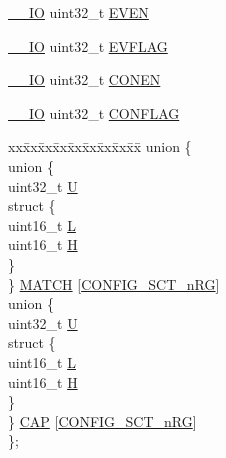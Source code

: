 \begin{DoxyCompactItemize}
\hyperlink{core__sc300_8h_aec43007d9998a0a0e01faede4133d6be}{\+\_\+\+\_\+\+IO} uint32\+\_\+t \hyperlink{struct_l_p_c___s_c_t___t_ad9f39c9fadfad8b684ab6248e25d4d37}{E\+V\+EN}
\item 
\hyperlink{core__sc300_8h_aec43007d9998a0a0e01faede4133d6be}{\+\_\+\+\_\+\+IO} uint32\+\_\+t \hyperlink{struct_l_p_c___s_c_t___t_a35160d3021178faa041dd38574ea9399}{E\+V\+F\+L\+AG}
\item 
\hyperlink{core__sc300_8h_aec43007d9998a0a0e01faede4133d6be}{\+\_\+\+\_\+\+IO} uint32\+\_\+t \hyperlink{struct_l_p_c___s_c_t___t_a594680b4be50db4bd8888f8e5791339c}{C\+O\+N\+EN}
\item 
\hyperlink{core__sc300_8h_aec43007d9998a0a0e01faede4133d6be}{\+\_\+\+\_\+\+IO} uint32\+\_\+t \hyperlink{struct_l_p_c___s_c_t___t_aeaa0c7af7f080325b6b5360add390e0b}{C\+O\+N\+F\+L\+AG}
\item 
\begin{tabbing}
xx\=xx\=xx\=xx\=xx\=xx\=xx\=xx\=xx\=\kill
union \{\\
\>union \{\\
\>\>uint32\_t \hyperlink{struct_l_p_c___s_c_t___t_a0be9245237cb05f7d9f5b1a9be51dfb0}{U}\\
\>\>struct \{\\
\>\>\>uint16\_t \hyperlink{struct_l_p_c___s_c_t___t_ac73594dbfa9ce3fcc7ce43435dad7b88}{L}\\
\>\>\>uint16\_t \hyperlink{struct_l_p_c___s_c_t___t_aadbde3d0fa10305e4c707635761c7082}{H}\\
\>\>\} \\
\>\} \hyperlink{struct_l_p_c___s_c_t___t_a73d31ea0c0b3a1596bf5b38eb21b9251}{MATCH} \mbox{[}\hyperlink{group___s_c_t__18_x_x__43_x_x_ga8d80e251208a01483a6b00c81ecb7493}{CONFIG\_SCT\_nRG}\mbox{]}\\
\>union \{\\
\>\>uint32\_t \hyperlink{struct_l_p_c___s_c_t___t_a0be9245237cb05f7d9f5b1a9be51dfb0}{U}\\
\>\>struct \{\\
\>\>\>uint16\_t \hyperlink{struct_l_p_c___s_c_t___t_ac73594dbfa9ce3fcc7ce43435dad7b88}{L}\\
\>\>\>uint16\_t \hyperlink{struct_l_p_c___s_c_t___t_aadbde3d0fa10305e4c707635761c7082}{H}\\
\>\>\} \\
\>\} \hyperlink{struct_l_p_c___s_c_t___t_a13750ad1975955509b277133c1ea909b}{CAP} \mbox{[}\hyperlink{group___s_c_t__18_x_x__43_x_x_ga8d80e251208a01483a6b00c81ecb7493}{CONFIG\_SCT\_nRG}\mbox{]}\\
\}; \\


\end{tabbing}
\end{DoxyCompactItemize}
